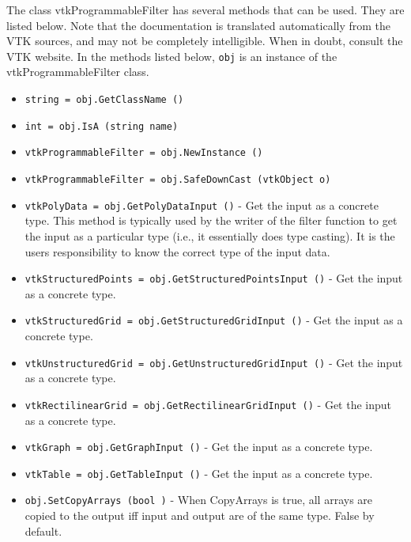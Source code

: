 The class vtkProgrammableFilter has several methods that can be used.
  They are listed below.
Note that the documentation is translated automatically from the VTK sources,
and may not be completely intelligible.  When in doubt, consult the VTK website.
In the methods listed below, \verb|obj| is an instance of the vtkProgrammableFilter class.
\begin{itemize}
\item  \verb|string = obj.GetClassName ()|

\item  \verb|int = obj.IsA (string name)|

\item  \verb|vtkProgrammableFilter = obj.NewInstance ()|

\item  \verb|vtkProgrammableFilter = obj.SafeDownCast (vtkObject o)|

\item  \verb|vtkPolyData = obj.GetPolyDataInput ()| -  Get the input as a concrete type. This method is typically used by the
 writer of the filter function to get the input as a particular type (i.e.,
 it essentially does type casting). It is the users responsibility to know
 the correct type of the input data.

\item  \verb|vtkStructuredPoints = obj.GetStructuredPointsInput ()| -  Get the input as a concrete type.

\item  \verb|vtkStructuredGrid = obj.GetStructuredGridInput ()| -  Get the input as a concrete type.

\item  \verb|vtkUnstructuredGrid = obj.GetUnstructuredGridInput ()| -  Get the input as a concrete type.

\item  \verb|vtkRectilinearGrid = obj.GetRectilinearGridInput ()| -  Get the input as a concrete type.

\item  \verb|vtkGraph = obj.GetGraphInput ()| -  Get the input as a concrete type.

\item  \verb|vtkTable = obj.GetTableInput ()| -  Get the input as a concrete type.

\item  \verb|obj.SetCopyArrays (bool )| -  When CopyArrays is true, all arrays are copied to the output
 iff input and output are of the same type. False by default.


\end{itemize}

